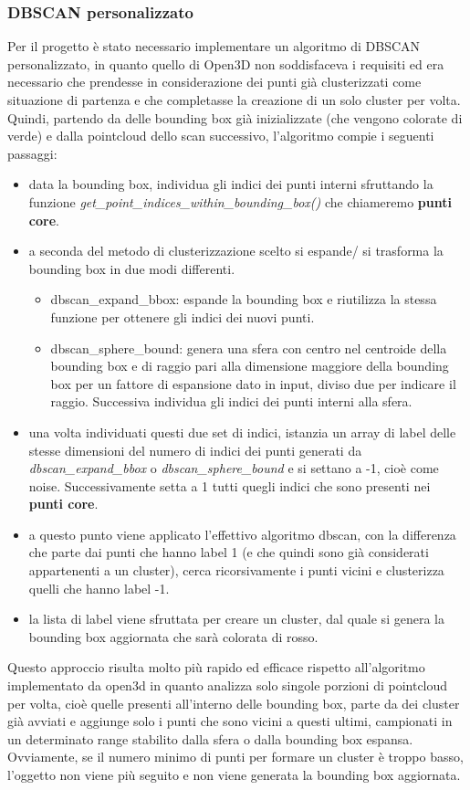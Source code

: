 \documentclass[italian]{article}
\begin{document}
\subsubsection{DBSCAN personalizzato}
Per il progetto è stato necessario implementare un algoritmo di DBSCAN personalizzato, in quanto quello di Open3D non soddisfaceva i requisiti ed era necessario che prendesse in considerazione dei punti già clusterizzati come situazione di partenza e che completasse la creazione di un solo cluster per volta.\\
Quindi, partendo da delle bounding box già inizializzate (che vengono colorate di verde) e dalla pointcloud dello scan successivo, l'algoritmo compie i seguenti passaggi:
\begin{itemize}
	\item data la bounding box, individua gli indici dei punti interni sfruttando la funzione \textit{get\_point\_indices\_within\_bounding\_box()} che chiameremo \textbf{punti core}.
	\item a seconda del metodo di clusterizzazione scelto si espande/ si trasforma la bounding box in due modi differenti.
		\begin{itemize}
			\item dbscan\_expand\_bbox: espande la bounding box e riutilizza la stessa funzione per ottenere gli indici dei nuovi punti.
			\item dbscan\_sphere\_bound: genera una sfera con centro nel centroide della bounding box e di raggio pari alla dimensione maggiore della bounding box per un fattore di espansione dato in input, diviso due 					per indicare il raggio. Successiva individua gli indici dei punti interni alla sfera.
		\end{itemize}
	\item una volta individuati questi due set di indici, istanzia un array di label delle stesse dimensioni del numero di indici dei punti generati da \textit{dbscan\_expand\_bbox} o \textit{dbscan\_sphere\_bound} e si settano a -1, cioè come noise. Successivamente setta a 1 tutti quegli indici che sono presenti nei \textbf{punti core}.
	\item a questo punto viene applicato l'effettivo algoritmo dbscan, con la differenza che parte dai punti che hanno label 1 (e che quindi sono già considerati appartenenti a un cluster), cerca ricorsivamente i punti vicini e clusterizza quelli che hanno label -1.
	\item la lista di label viene sfruttata per creare un cluster, dal quale si genera la bounding box aggiornata che sarà colorata di rosso.
\end{itemize}
Questo approccio risulta molto più rapido ed efficace rispetto all'algoritmo implementato da open3d in quanto analizza solo singole porzioni di pointcloud per volta, cioè quelle presenti all'interno delle bounding box, parte da dei cluster già avviati e aggiunge solo i punti che sono vicini a questi ultimi, campionati in un determinato range stabilito dalla sfera o dalla bounding box espansa.\\
Ovviamente, se il numero minimo di punti per formare un cluster è troppo basso, l'oggetto non viene più seguito e non viene generata la bounding box aggiornata.
\end{document}
